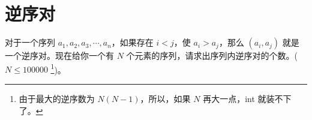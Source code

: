 \section{逆序对}
	对于一个序列 $a_1,a_2,a_3,\cdots ,a_n$，如果存在 $i<j$，使 $a_i>a_j$，那么 $(a_i,a_j)$ 就是一个逆序对。现在给你一个有 $N$ 个元素的序列，请求出序列内逆序对的个数。($N\leqslant 100000$ \footnote{由于最大的逆序数为 $N(N-1)$，所以，如果 $N$ 再大一点，int 就装不下了。})。

    
    
    
